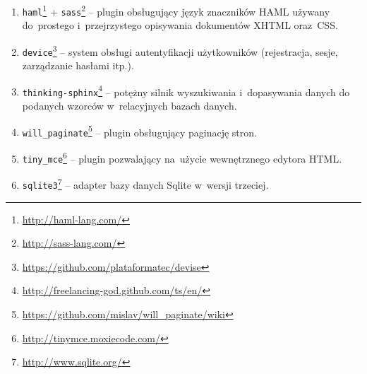 \begin{enumerate}
  \item \texttt{haml}\footnote{\url{http://haml-lang.com/}} + \texttt{sass}\footnote{\url{http://sass-lang.com/}} -- plugin obsługujący język znaczników HAML używany do~prostego i~przejrzystego opisywania dokumentów XHTML oraz~CSS.
  \item \texttt{device}\footnote{\url{https://github.com/plataformatec/devise}} -- system obsługi autentyfikacji użytkowników (rejestracja, sesje, zarządzanie hasłami itp.).
  \item \texttt{thinking-sphinx}\footnote{\url{http://freelancing-god.github.com/ts/en/}} -- potężny silnik wyszukiwania i~dopasywania danych do podanych wzorców w~relacyjnych bazach danych.
  \item \texttt{will\_paginate}\footnote{\url{https://github.com/mislav/will_paginate/wiki}} -- plugin obsługujący paginację stron.
  \item \texttt{tiny\_mce}\footnote{\url{http://tinymce.moxiecode.com/}} -- plugin pozwalający na~użycie wewnętrznego edytora HTML.
  \item \texttt{sqlite3}\footnote{\url{http://www.sqlite.org/}} -- adapter bazy danych Sqlite w~wersji trzeciej.
\end{enumerate}
